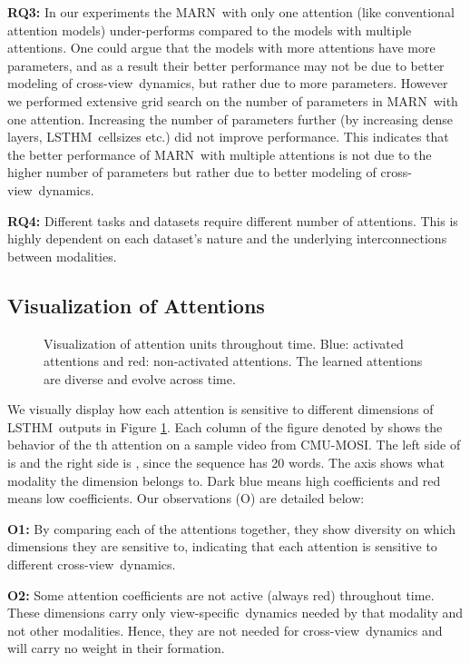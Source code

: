 \documentclass[letterpaper]{article} \usepackage{aaai18}  \usepackage{times}  \usepackage{helvet}  \usepackage{courier}  \usepackage{url}  \usepackage{graphicx}  \usepackage{multirow}
\newcommand{\pipelines}{MARN}
\newcommand{\intra}{view-specific}
\newcommand{\inter}{cross-view}
\newcommand{\tnames}{LSTHM}
\begin{document}
\textbf{RQ3:} In our experiments the \pipelines \ with only one attention (like conventional attention models) under-performs compared to the models with multiple attentions. One could argue that the models with more attentions have more parameters, and as a result their better performance may not be due to better modeling of \inter \ dynamics, but rather due to more parameters. However we performed extensive grid search on the number of parameters in \pipelines \ with one attention. Increasing the number of parameters further (by increasing dense layers, \tnames \ cellsizes etc.) did not improve performance. This indicates that the better performance of \pipelines \ with multiple attentions is not due to the higher number of parameters but rather due to better modeling of \inter \ dynamics.

\textbf{RQ4:} Different tasks and datasets require different number of attentions. This is highly dependent on each dataset's nature and the underlying interconnections between modalities. 

\subsection{Visualization of Attentions}

\begin{figure}[t!]
\caption{Visualization of attention units throughout time. Blue: activated attentions and red: non-activated attentions. The learned attentions are diverse and evolve across time.}
\label{fig:attv}
\end{figure}

We visually display how each attention is sensitive to different dimensions of \tnames \ outputs in Figure \ref{fig:attv}. Each column of the figure denoted by  shows the behavior of the th attention on a sample video from CMU-MOSI. The left side of  is  and the right side is , since the sequence has 20 words. The  axis shows what modality the dimension belongs to. Dark blue means high coefficients and red means low coefficients. Our observations (O) are detailed below:

\textbf{O1:} By comparing each of the attentions together, they show diversity on which dimensions they are sensitive to, indicating that each attention is sensitive to different \inter \ dynamics. 

\textbf{O2:} Some attention coefficients are not active (always red) throughout time. These dimensions carry only \intra \ dynamics needed by that modality and not other modalities. Hence, they are not needed for \inter \ dynamics and will carry no weight in their formation. 
\end{document}
